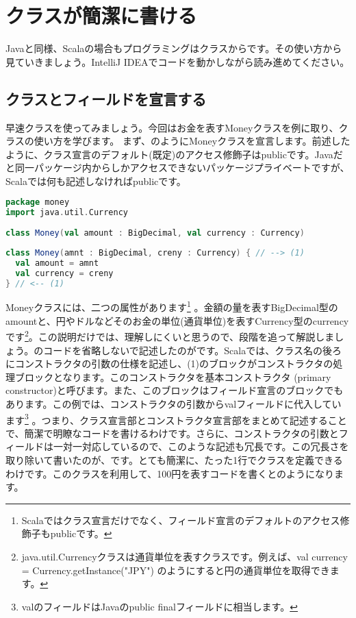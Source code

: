 \section{クラスが簡潔に書ける}
Javaと同様、Scalaの場合もプログラミングはクラスからです。その使い方から見ていきましょう。IntelliJ IDEAでコードを動かしながら読み進めてください。
\subsection{クラスとフィールドを宣言する}
早速クラスを使ってみましょう。今回はお金を表すMoneyクラスを例に取り、クラスの使い方を学びます。 まず、のようにMoneyクラスを宣言します。前述したように、クラス宣言のデフォルト(既定)のアクセス修飾子はpublicです。Javaだと同一パッケージ内からしかアクセスできないパッケージプライベートですが、Scalaでは何も記述しなければpublicです。

\begin{lstlisting}[language=scala, label=src:money, caption=Moneyクラス]
package money
import java.util.Currency
 
class Money(val amount : BigDecimal, val currency : Currency)
\end{lstlisting}

\begin{lstlisting}[language=scala, label=src:verbose_money, caption=Moneyクラス(省略しないで書いたもの)]
class Money(amnt : BigDecimal, creny : Currency) { // --> (1)
  val amount = amnt
  val currency = creny
} // <-- (1)
\end{lstlisting}

Moneyクラスには、二つの属性があります\footnote{Scalaではクラス宣言だけでなく、フィールド宣言のデフォルトのアクセス修飾子もpublicです。} 。金額の量を表すBigDecimal型のamountと、円やドルなどそのお金の単位(通貨単位)を表すCurrency型のcurrencyです\footnote{java.util.Currencyクラスは通貨単位を表すクラスです。例えば、val currency = Currency.getInstance("JPY") のようにすると円の通貨単位を取得できます。}。この説明だけでは、理解しにくいと思うので、段階を追って解説しましょう。のコードを省略しないで記述したのがです。Scalaでは、クラス名の後ろにコンストラクタの引数の仕様を記述し、(1)のブロックがコンストラクタの処理ブロックとなります。このコンストラクタを基本コンストラクタ (primary constructor)と呼びます。また、このブロックはフィールド宣言のブロックでもあります。この例では、コンストラクタの引数からvalフィールドに代入しています\footnote{valのフィールドはJavaのpublic finalフィールドに相当します。} 。つまり、クラス宣言部とコンストラクタ宣言部をまとめて記述することで、簡潔で明瞭なコードを書けるわけです。さらに、コンストラクタの引数とフィールドは一対一対応しているので、このような記述も冗長です。この冗長さを取り除いて書いたのが、です。とても簡潔に、たった1行でクラスを定義できるわけです。このクラスを利用して、100円を表すコードを書くとのようになります。


